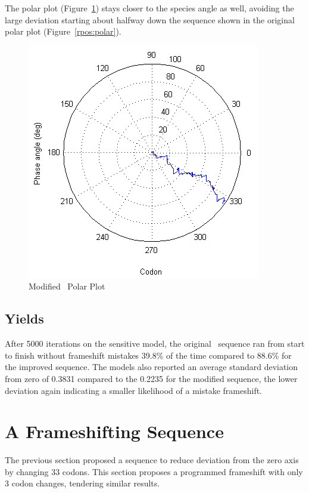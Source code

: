 \documentclass[10pt,twocolumn]{article}
\begin{document}
The polar plot (Figure~\ref{rposmax:polar}) stays closer to the species angle as well,  
avoiding the large deviation starting about halfway down the sequence shown in the original polar plot (Figure~\ref{rpos:polar}).

\begin{figure}[htp]
    \centering
    \caption{Modified \rpoS\ Polar Plot}
    \label{rposmax:polar}
    \includegraphics[scale=0.7]{rpoS/max-polar.png}
\end{figure}

\subsection{Yields}

After 5000 iterations on the sensitive model, the original \rpoS\ sequence
ran from start to finish without frameshift mistakes 39.8\% of the time compared to
88.6\% for the improved sequence. The models also reported an average standard deviation from zero of
0.3831 compared to the 0.2235 for the modified sequence, the lower deviation again
indicating a smaller likelihood of a mistake frameshift.

\section{A Frameshifting Sequence}

The previous section proposed a sequence to reduce deviation from the zero axis by changing 33 codons.
This section proposes a programmed frameshift with only 3 codon changes, tendering similar results.
\end{document}
